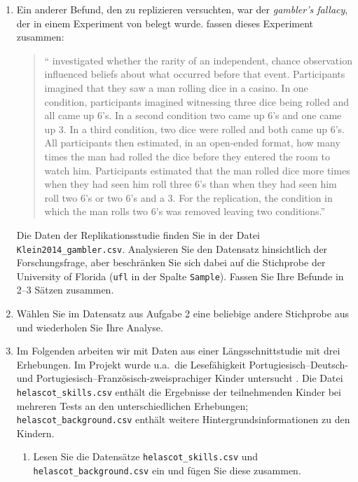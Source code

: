 \documentclass[oneside, 10pt]{book}\usepackage[]{graphicx}\usepackage[]{xcolor}
\begin{document}
\begin{enumerate}
 \item Ein anderer Befund, den \citet{Klein2014} zu replizieren
 versuchten, war der \textit{gambler's fallacy}, der in einem
 Experiment von \citet{Oppenheimer2009a} belegt wurde. \citet{Klein2014}
 fassen dieses Experiment zusammen:
 \begin{quote}
 ``\citet{Oppenheimer2009a} investigated whether the rarity of an independent, chance
 observation influenced beliefs about what occurred before that event.
 Participants imagined that they saw a man rolling dice in a casino.
 In one condition, participants imagined witnessing three dice being rolled
 and all came up 6's. In a second condition two came up 6's and one came up 3.
 In a third condition, two dice were rolled and both came up 6's.
 All participants then estimated, in an open-ended format, how
 many times the man had rolled the dice before they
 entered the room to watch him. Participants estimated
 that the man rolled dice more times when they had
 seen him roll three 6's than when they had seen him
 roll two 6's or two 6's and a 3. For the replication,
 the condition in which the man rolls two 6's was removed leaving two conditions.''
 \end{quote}

 Die Daten der Replikationsstudie finden Sie in der Datei
 \texttt{Klein2014\_gambler.csv}. Analysieren Sie den Datensatz
 hinsichtlich der Forschungsfrage, aber beschränken Sie sich
 dabei auf die Stichprobe der University of Florida (\texttt{ufl}
 in der Spalte \texttt{Sample}). Fassen Sie Ihre Befunde in 2--3 Sätzen
 zusammen.

 \item Wählen Sie im Datensatz aus Aufgabe 2 eine beliebige andere Stichprobe
 aus und wiederholen Sie Ihre Analyse.

 \item Im Folgenden arbeiten wir mit Daten aus einer Längsschnittstudie
 mit drei Erhebungen. Im
 Projekt wurde u.a.\ die Lesefähigkeit Portugiesisch--Deutsch- und Portugiesisch--Französisch-zweisprachiger
 Kinder untersucht \citep{Lambelet_HELASCOT_umbrella,Pestana_HELASCOT_reading}.
 Die Datei \texttt{helascot\_skills.csv} enthält die Ergebnisse
 der teilnehmenden Kinder bei mehreren Tests an den unterschiedlichen Erhebungen;
 \texttt{helascot\_background.csv} enthält weitere Hintergrundsinformationen zu den Kindern.
 \begin{enumerate}
  \item Lesen Sie die Datensätze \texttt{helascot\_skills.csv} und \texttt{helascot\_background.csv} ein
  und fügen Sie diese zusammen.


\end{enumerate}
\end{enumerate}
\end{document}
